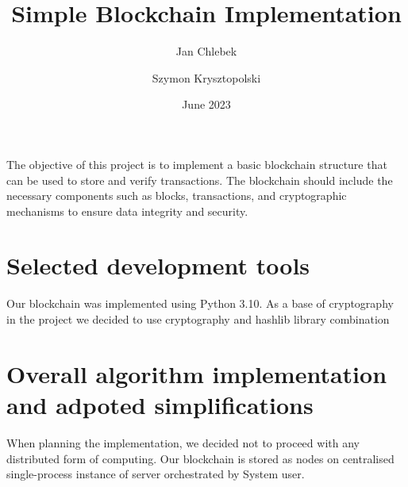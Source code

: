 \documentclass{article}
\title{Simple Blockchain Implementation}
\author{Jan Chlebek
\and Szymon Krysztopolski
}
\date{June 2023}
\begin{document}
\maketitle

The objective of this project is to implement a basic blockchain structure that can be used to
store and verify transactions. The blockchain should include the necessary components such as blocks,
transactions, and cryptographic mechanisms to ensure data integrity and security.

\section{Selected development tools}
Our blockchain was implemented using Python 3.10.
As a base of cryptography in the project we decided to use cryptography and hashlib library combination


\section{Overall algorithm implementation and adpoted simplifications}
When planning the implementation, we decided not to proceed with any distributed form of computing. Our blockchain is stored as nodes on centralised single-process instance of server orchestrated by System user.
\end{document}
